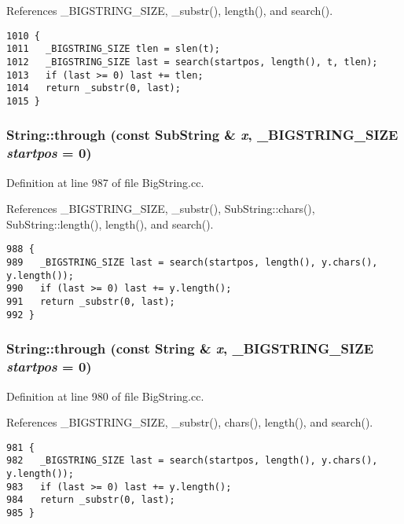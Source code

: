References \_\-BIGSTRING\_\-SIZE, \_\-substr(), length(), and search().



\footnotesize\begin{verbatim}1010 {
1011   _BIGSTRING_SIZE tlen = slen(t);
1012   _BIGSTRING_SIZE last = search(startpos, length(), t, tlen);
1013   if (last >= 0) last += tlen;
1014   return _substr(0, last);
1015 }
\end{verbatim}\normalsize 
{}
\subsubsection{ String::through (const {\bf Sub\-String} \& {\em x}, {\bf \_\-BIGSTRING\_\-SIZE} {\em startpos} = 0)}\label{classString_a66}




Definition at line 987 of file Big\-String.cc.

References \_\-BIGSTRING\_\-SIZE, \_\-substr(), Sub\-String::chars(), Sub\-String::length(), length(), and search().



\footnotesize\begin{verbatim}988 {
989   _BIGSTRING_SIZE last = search(startpos, length(), y.chars(), y.length());
990   if (last >= 0) last += y.length();
991   return _substr(0, last);
992 }
\end{verbatim}\normalsize 
{}
\subsubsection{ String::through (const String \& {\em x}, {\bf \_\-BIGSTRING\_\-SIZE} {\em startpos} = 0)}\label{classString_a65}




Definition at line 980 of file Big\-String.cc.

References \_\-BIGSTRING\_\-SIZE, \_\-substr(), chars(), length(), and search().



\footnotesize\begin{verbatim}981 {
982   _BIGSTRING_SIZE last = search(startpos, length(), y.chars(), y.length());
983   if (last >= 0) last += y.length();
984   return _substr(0, last);
985 }
\end{verbatim}\normalsize 
{}
